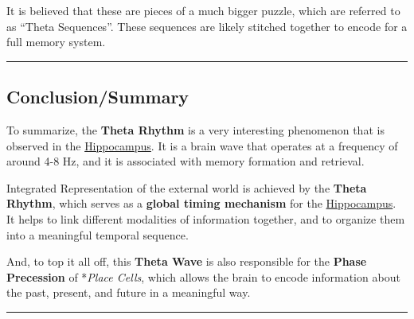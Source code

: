 \documentclass[
]{article}
\begin{document}
It is believed that these are pieces of a much bigger puzzle, which are
referred to as ``Theta Sequences''. These sequences are likely stitched
together to encode for a full memory system.

\begin{center}\rule{0.5\linewidth}{0.5pt}\end{center}

\subsection{Conclusion/Summary}\label{conclusionsummary}

To summarize, the \textbf{Theta Rhythm} is a very interesting phenomenon
that is observed in the \url{Hippocampus}. It is a brain wave that
operates at a frequency of around 4-8 Hz, and it is associated with
memory formation and retrieval.

Integrated Representation of the external world is achieved by the
\textbf{Theta Rhythm}, which serves as a \textbf{global timing
mechanism} for the \url{Hippocampus}. It helps to link different
modalities of information together, and to organize them into a
meaningful temporal sequence.

And, to top it all off, this \textbf{Theta Wave} is also responsible for
the \textbf{Phase Precession} of *\emph{Place Cells}, which allows the
brain to encode information about the past, present, and future in a
meaningful way.

\begin{center}\rule{0.5\linewidth}{0.5pt}\end{center}
\end{document}
